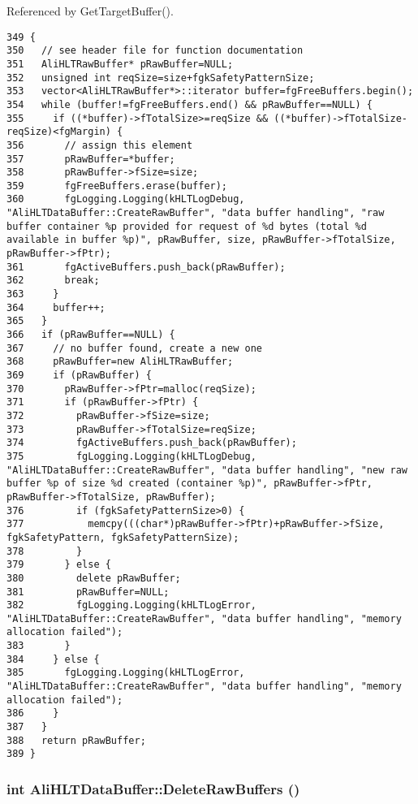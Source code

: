 Referenced by Get\-Target\-Buffer().

\footnotesize\begin{verbatim}349 {
350   // see header file for function documentation
351   AliHLTRawBuffer* pRawBuffer=NULL;
352   unsigned int reqSize=size+fgkSafetyPatternSize;
353   vector<AliHLTRawBuffer*>::iterator buffer=fgFreeBuffers.begin();
354   while (buffer!=fgFreeBuffers.end() && pRawBuffer==NULL) {
355     if ((*buffer)->fTotalSize>=reqSize && ((*buffer)->fTotalSize-reqSize)<fgMargin) {
356       // assign this element
357       pRawBuffer=*buffer;
358       pRawBuffer->fSize=size;
359       fgFreeBuffers.erase(buffer);
360       fgLogging.Logging(kHLTLogDebug, "AliHLTDataBuffer::CreateRawBuffer", "data buffer handling", "raw buffer container %p provided for request of %d bytes (total %d available in buffer %p)", pRawBuffer, size, pRawBuffer->fTotalSize, pRawBuffer->fPtr);
361       fgActiveBuffers.push_back(pRawBuffer);
362       break;
363     }
364     buffer++;
365   }
366   if (pRawBuffer==NULL) {
367     // no buffer found, create a new one
368     pRawBuffer=new AliHLTRawBuffer;
369     if (pRawBuffer) {
370       pRawBuffer->fPtr=malloc(reqSize);
371       if (pRawBuffer->fPtr) {
372         pRawBuffer->fSize=size;
373         pRawBuffer->fTotalSize=reqSize;
374         fgActiveBuffers.push_back(pRawBuffer);
375         fgLogging.Logging(kHLTLogDebug, "AliHLTDataBuffer::CreateRawBuffer", "data buffer handling", "new raw buffer %p of size %d created (container %p)", pRawBuffer->fPtr, pRawBuffer->fTotalSize, pRawBuffer);
376         if (fgkSafetyPatternSize>0) {
377           memcpy(((char*)pRawBuffer->fPtr)+pRawBuffer->fSize, fgkSafetyPattern, fgkSafetyPatternSize);
378         }
379       } else {
380         delete pRawBuffer;
381         pRawBuffer=NULL;
382         fgLogging.Logging(kHLTLogError, "AliHLTDataBuffer::CreateRawBuffer", "data buffer handling", "memory allocation failed");
383       } 
384     } else {
385       fgLogging.Logging(kHLTLogError, "AliHLTDataBuffer::CreateRawBuffer", "data buffer handling", "memory allocation failed");
386     }
387   }
388   return pRawBuffer;
389 }
\end{verbatim}\normalsize 


\subsubsection{\setlength{\rightskip}{0pt plus 5cm}int Ali\-HLTData\-Buffer::Delete\-Raw\-Buffers ()\hspace{0.3cm}{\tt  [static, private]}}\label{classAliHLTDataBuffer_h2}


